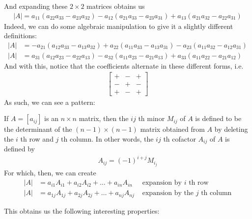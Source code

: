 \documentclass[a4paper]{article}
\theoremstyle{plain}
\theoremstyle{definition}
\newtheorem{defn}{Definition}[section]
\theoremstyle{remark}
\begin{document}
And expanding these $2\times 2$ matrices obtains us
\begin{align*}
	|A| = a_{11}(a_{22}a_{33}-a_{23}a_{32})-a_{12}(a_{21}a_{33}-a_{23}a_{31})+a_{13}(a_{21}a_{32}-a_{22}a_{31})
\end{align*}
Indeed, we can do some algebraic manipulation to give it a slightly different definitions:
\begin{align*}
	|A| &= -a_{21}(a_{12}a_{33}-a_{13}a_{32})+a_{22}(a_{11}a_{33}-a_{13}a_{31})-a_{23}(a_{11}a_{32}-a_{12}a_{31})\\
	|A| &= a_{31}(a_{12}a_{23}-a_{22}a_{13})-a_{32}(a_{11}a_{23}-a_{21}a_{13})+a_{33}(a_{11}a_{22}-a_{21}a_{12})
\end{align*}
And with this, notice that the coefficients alternate in these different forms, i.e.
\begin{align*}
	\begin{bmatrix} + & - & + \\
	- & + & - \\
+ & - & +\end{bmatrix} 
\end{align*}
As such, we can see a pattern:
\begin{tcolorbox}[colback=black!3!white,colframe=black!60!white,title=\begin{defn}Determinants of n matrices \label{Determinants of n matrices}\end{defn}]
If $A = [a_{ij}]$ is an $n \times n$ matrix, then the $ij$ th minor $M_{ij}$ of $A$ is defined to be the determinant of the $(n-1)\times (n-1)$ matrix obtained from $A$ by deleting the $i$ th row and $j$ th column. In other words, the $ij$ th cofactor $A_{ij}$ of $A$ is defined by
\begin{align}
A_{ij} =  (-1)^{i+j}M_i_j
\end{align}
For which, then, we can create
\begin{align}
	|A| &= a_{i1}A_{i1}+a_{i2}A_{i2}+\ldots+a_{in}A_{in} &\text{ expansion by $i$ th row}\\
	|A| &= a_{1j}A_{1j}+a_{2j}A_{2j}+\ldots+a_{nj}A_{nj} & \text{ expansion by the $j$ th column}
\end{align}
\end{tcolorbox}
This obtains us the following interesting properties:
\end{document}
